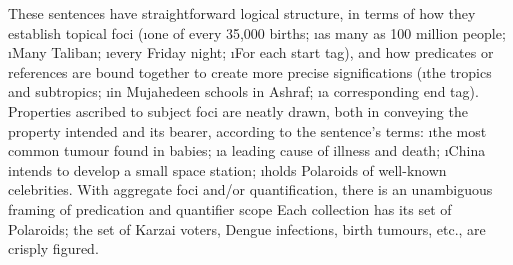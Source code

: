{These sentences have straightforward logical structure, in terms of
how they establish topical foci (\i{one of every 35,000 births};
\i{as many as 100 million people};
\i{Many Taliban}; \i{every Friday night}; \i{For each start tag}),
and how predicates or references are bound together to create more
precise significations (\i{the tropics and subtropics};
\i{in Mujahedeen schools in Ashraf}; \i{a corresponding end tag}).
Properties ascribed to subject foci are neatly drawn, both in
conveying the property intended and its bearer, according to
the sentence's terms: \i{the most common tumour found in babies};
\i{a leading cause of illness and death};
\i{China intends to develop a small space station};
\i{holds Polaroids of well-known celebrities}.  With
aggregate foci and/or quantification, there is an unambiguous
framing of predication and quantifier scope \mdash{} Each collection
has its set of Polaroids; the set of Karzai voters, Dengue infections,
birth tumours, etc., are crisply figured.
}

